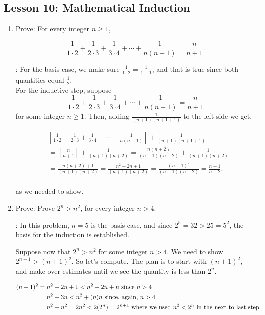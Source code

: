 \documentclass[11pt]{amsart}
\begin{document}
\subsection{Lesson 10: Mathematical Induction}

\begin{enumerate}


\item Prove: For every integer $n\geq 1$,

\[
\frac{1}{1\cdot2}+\frac{1}{2\cdot3}+\frac{1}{3\cdot4}+\cdots+\frac{1}{n(n+1)}= \frac{n}{n+1}.
\]
\medskip

: For the basis case, we make sure $\displaystyle \frac{1}{1\cdot2} =\frac {1}{1+1}$,
and that is true since both quantities equal $\displaystyle\frac{1}{2}$.\\[5pt]

For the inductive step, suppose 
\[
\frac{1}{1\cdot2}+\frac{1}{2\cdot3}+\frac{1}{3\cdot4}+\cdots+\frac{1}{n(n+1)}= \frac{n}{n+1}
\]
for some integer $n\geq 1$. Then, adding $\displaystyle\frac{1}{(n+1)(n+1+1)}$ to the left side we get,

\begin{align*}
& \left[\frac{1}{1\cdot2}+\frac{1}{2\cdot3}+\frac{1}{3\cdot4}+\cdots+\frac{1}{n(n+1)}\right]
+ \frac{1}{(n+1)(n+1+1)}\\[5pt]
& = \left[ \frac{n}{n+1}\right] + \frac{1}{(n+1)(n+2)} = \frac{n(n+2)}{(n+1)(n+2)}  + \frac{1}{(n+1)(n+2)}
\\[5pt]
& = \frac{n(n+2) + 1}{(n+1)(n+2)} = \frac{n^2+2n+1}{(n+1)(n+2)} = \frac{(n+1)^2}{(n+1)(n+2)}
= \frac{n+1}{n+2}.\\[5pt]
\end{align*}

as we needed to show.

\medskip

\item Prove: Prove $2^n>n^2$, for every integer $n>4$.
\medskip

: In this problem, $n=5$ is the basis case, and since $2^5 = 32>25=5^2$,
the basis for the induction is established.

Suppose now that $2^n>n^2$ for some integer $n>4$. We need to show $2^{n+1}> (n+1)^2$.
So let's compute. The plan is to start with $(n+1)^2$, and make over estimates until we see
the quantity is less than $2^n$.

\begin{align*}
(n+1)^2 &= n^2 + 2n +1 < n^2 + 2n + n \text { since $n>4$}\cr
&= n^2 + 3n <  n^2 + (n)n   \text { since, again, $n>4$}\cr
& = n^2 + n^2 = 2n^2 < 2(2^n) = 2^{n+1} \text{ where we used $n^2<2^n$ in the next to last step.}\cr
\end{align*}


\end{enumerate}
\end{document}
